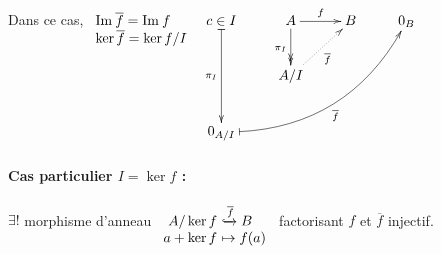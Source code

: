 \documentclass[reqno,a4paper,10pt]{report}
\newcommand{\im}{\mathrm{Im}\:} %
\begin{document}
Dans ce cas, $
\begin{array}[t]{l}
  \im \overline{f}= \im f\\
  \ker \overline f = \ker f / I
\end{array}$\hspace{4.2em}
$\xymatrix{
  c\in I\ar@{|->}[dd]_{\pi_I} &A \ar[r]^f \ar@{->>}[d]_{\pi_I} & B & 0_B\\
  &A/I \ar@{.>}[ur]_{\overline{f}} &\\
  0_{A/I} \ar@/_2pc/@{|->}[uurrr]_{\overline f}
}$
\paragraph{Cas particulier $I=\ker f$ :}
$\exists !$ morphisme d'anneau $\begin{array}[t]{r@{\ }l}
  A/\ker f &\xhookrightarrow{\overline f} B \\
  a+ \ker f &\mapsto f(a)
\end{array}$ factorisant $f$ et $\overline f$ injectif.
\end{document}

